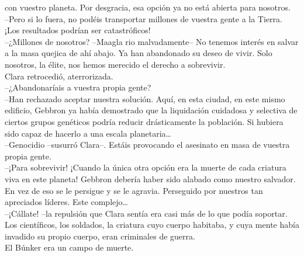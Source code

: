 con vuestro planeta. Por desgracia, esa opción ya no está abierta para
nosotros.\\
--Pero si lo fuera, no podéis transportar millones de vuestra gente a la
Tierra. ¡Los resultados podrían ser catastróficos!\\
--¿Millones de nosotros? --Maagla rio malvadamente-- No tenemos interés
en salvar a la masa quejica de ahí abajo. Ya han abandonado su deseo de
vivir. Solo nosotros, la élite, nos hemos merecido el derecho a
sobrevivir.\\
Clara retrocedió, aterrorizada.\\
--¿Abandonaríais a vuestra propia gente?\\
--Han rechazado aceptar nuestra solución. Aquí, en esta ciudad, en este
mismo edificio, Gebbron ya había demostrado que la liquidación cuidadosa
y selectiva de ciertos grupos genéticos podría reducir drásticamente la
población. Si hubiera sido capaz de hacerlo a una escala
planetaria\ldots{}\\
--Genocidio --susurró Clara--. Estáis provocando el asesinato en masa de
vuestra propia gente.\\
--¡Para sobrevivir! ¡Cuando la única otra opción era la muerte de cada
criatura viva en este planeta! Gebbron debería haber sido alabado como
nuestro salvador. En vez de eso se le persigue y se le agravia.
Perseguido por nuestros tan apreciados líderes. Este complejo\ldots{}\\
--¡Cállate! --la repulsión que Clara sentía era casi más de lo que podía
soportar. Los científicos, los soldados, la criatura cuyo cuerpo
habitaba, y cuya mente había invadido su propio cuerpo, eran criminales
de guerra.\\
El Búnker era un campo de muerte.\\
